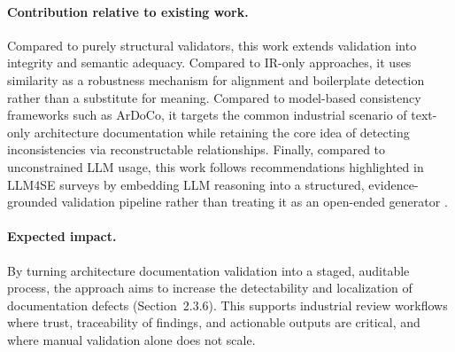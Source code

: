 \paragraph{Contribution relative to existing work.}
Compared to purely structural validators, this work extends validation into integrity and semantic adequacy. Compared to IR-only approaches, it uses similarity as a robustness mechanism for alignment and boilerplate detection rather than a substitute for meaning. Compared to model-based consistency frameworks such as ArDoCo, it targets the common industrial scenario of text-only architecture documentation while retaining the core idea of detecting inconsistencies via reconstructable relationships. Finally, compared to unconstrained LLM usage, this work follows recommendations highlighted in LLM4SE surveys by embedding LLM reasoning into a structured, evidence-grounded validation pipeline rather than treating it as an open-ended generator \cite{llm4se_slr}.

\paragraph{Expected impact.}
By turning architecture documentation validation into a staged, auditable process, the approach aims to increase the detectability and localization of documentation defects (Section~2.3.6). This supports industrial review workflows where trust, traceability of findings, and actionable outputs are critical, and where manual validation alone does not scale.
